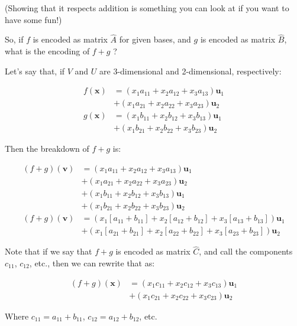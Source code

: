 \documentclass[]{article}
\begin{document}
(Showing that it respects addition is something you can look at if you want to
have some fun!)

So, if \(f\) is encoded as matrix \(\hat{A}\) for given bases, and \(g\) is
encoded as matrix \(\hat{B}\), what is the encoding of \(f + g\) ?

Let's say that, if \(V\) and \(U\) are 3-dimensional and 2-dimensional,
respectively:

\[
\begin{aligned}
f(\mathbf{x}) & = (x_1 a_{11} + x_2 a_{12} + x_3 a_{13}) \mathbf{u}_1 \\
              & + (x_1 a_{21} + x_2 a_{22} + x_3 a_{23}) \mathbf{u}_2 \\
g(\mathbf{x}) & = (x_1 b_{11} + x_2 b_{12} + x_3 b_{13}) \mathbf{u}_1 \\
              & + (x_1 b_{21} + x_2 b_{22} + x_3 b_{23}) \mathbf{u}_2
\end{aligned}
\]

Then the breakdown of \(f + g\) is:

\[
\begin{aligned}
(f + g)(\mathbf{v}) & = (x_1 a_{11} + x_2 a_{12} + x_3 a_{13}) \mathbf{u}_1 \\
                    & + (x_1 a_{21} + x_2 a_{22} + x_3 a_{23}) \mathbf{u}_2 \\
                    & + (x_1 b_{11} + x_2 b_{12} + x_3 b_{13}) \mathbf{u}_1 \\
                    & + (x_1 b_{21} + x_2 b_{22} + x_3 b_{23}) \mathbf{u}_2 \\
(f + g)(\mathbf{v}) & = (x_1 [a_{11} + b_{11}] + x_2 [a_{12} + b_{12}] + x_3 [a_{13} + b_{13}]) \mathbf{u}_1 \\
                    & + (x_1 [a_{21} + b_{21}] + x_2 [a_{22} + b_{22}] + x_3 [a_{23} + b_{23}]) \mathbf{u}_2
\end{aligned}
\]

Note that if we say that \(f + g\) is encoded as matrix \(\hat{C}\), and call
the components \(c_{11}\), \(c_{12}\), etc., then we can rewrite that as:

\[
\begin{aligned}
(f + g)(\mathbf{x}) & = (x_1 c_{11} + x_2 c_{12} + x_3 c_{13}) \mathbf{u}_1 \\
                    & + (x_1 c_{21} + x_2 c_{22} + x_3 c_{23}) \mathbf{u}_2
\end{aligned}
\]

Where \(c_{11} = a_{11} + b_{11}\), \(c_{12} = a_{12} + b_{12}\), etc.
\end{document}

